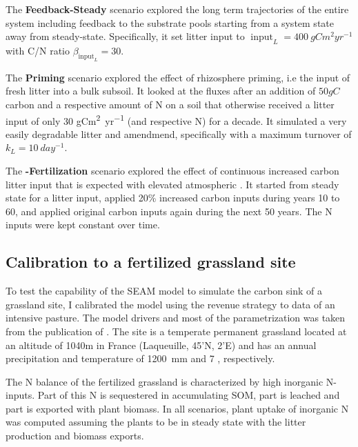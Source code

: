 The \textbf{Feedback-Steady} scenario explored the long term trajectories of the
entire system including feedback to the substrate pools starting from a system
state away from steady-state. Specifically, it set litter input to
$\operatorname{input}_L = 400~\unit{gCm^2yr^{-1}}$ with C/N ratio
$\beta_{\operatorname{input}_L} = 30$.

The \textbf{Priming} scenario explored the effect of rhizosphere priming, i.e
the input of fresh litter into a bulk subsoil. It looked at the fluxes after an
addition of $50gC$ carbon and a respective amount of N on a soil that otherwise
received a litter input of only 30 \unit{gCm^2yr^{-1}} (and
respective N) for a decade. It simulated a very easily degradable litter and
amendmend, specifically with a maximum turnover of $k_L = 10~\unit{day^{-1}}$.

The \textbf{-Fertilization} scenario explored the effect of
continuous increased carbon litter input that is expected with elevated atmospheric .
It started from steady state for a litter input, applied 20\% increased
carbon inputs during years 10 to 60, and applied original carbon inputs again
during the next 50 years. The N inputs were kept constant over time.

\subsection{Calibration to a fertilized grassland site}
\label{sec:methodsPasture}

To test the capability of the SEAM model to simulate the carbon sink of a
grassland site, I calibrated the model using the revenue strategy to data of an
intensive pasture.
The model drivers and most of the parametrization was taken from the publication
of \citep{Perveen14}. The site is a temperate permanent grassland located at an
altitude of 1040m in France (Laqueuille, 45'N,
2'E) and has an annual precipitation and temperature of 1200~mm
and 7 , respectively.

The N balance of the fertilized grassland is characterized by high inorganic
N-inputs. Part of this N is sequestered in accumulating SOM, part is leached and
part is exported with plant biomass. In all scenarios, plant uptake of inorganic N was
computed assuming the plants to be in steady state with the litter
production and biomass exports.
 
